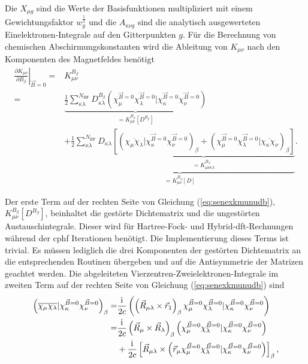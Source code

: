 Die $X_{\mu g}$ sind die Werte der Basisfunktionen multipliziert mit einem Gewichtungsfaktor $w_g^{\frac{1}{2}}$ und die $A_{\kappa\nu g}$ sind die analytisch ausgewerteten Einelektronen-Integrale auf den Gitterpunkten $g$. Für die Berechnung von chemischen Abschirmungskonstanten wird die Ableitung von $K_{\mu\nu}$ nach den Komponenten des Magnetfeldes benötigt
	\begin{equation}\label{eq:senexkmunudb}
	\begin{aligned}
	\left.\frac{\partial K_{\mu\nu}}{\partial B_\beta}\right\vert_{\vec{B}=0}=&K_{\mu\nu}^{B_\beta}\\
	=&\underbrace{\frac{1}{2}\sum_{\kappa\lambda}^{N_{\textrm{BF}}}D_{\kappa\lambda}^{B_\beta} \left(\chi_\mu^{\vec{B}=0}\chi_\lambda^{\vec{B}=0}\vert\chi_\kappa^{\vec{B}=0}\chi_\nu^{\vec{B}=0}\right)}_{=K_{\mu\nu}^{B_\beta}[D^{B_\beta}]}\\
	&\underbrace{+\frac{1}{2}\sum_{\kappa\lambda}^{N_{\textrm{BF}}}D_{\kappa\lambda} \underbrace{\left[\left(\overline{\chi_\mu\chi_\lambda}\vert\chi_\kappa^{\vec{B}=0}\chi_\nu^{\vec{B}=0}\right)_\beta+\left(\chi_\mu^{\vec{B}=0}\chi_\lambda^{\vec{B}=0}\vert\overline{\chi_\kappa\chi_\nu}\right)_\beta\right]}_{=K_{\mu\nu\kappa\lambda}^{B_\beta}}}_{=K_{\mu\nu}^{B_\beta}[D]}.
	\end{aligned}
	\end{equation}

Der erste Term auf der rechten Seite von Gleichung (\ref{eq:senexkmunudb}), $K_{\mu\nu}^{B_\beta}[D^{B_\beta}]$,  beinhaltet die gestörte Dichtematrix und die ungestörten Austauschintegrale. Dieser wird für Hartree-Fock- und Hybrid-\ac{dft}-Rechnungen während der \ac{cphf} Iterationen benötigt. Die Implementierung dieses Terms ist trivial. Es müssen lediglich die drei Komponenten der gestörten Dichtematrix an die entsprechenden Routinen übergeben und auf die Antisymmetrie der Matrizen geachtet werden. Die abgeleiteten Vierzentren-Zweielektronen-Integrale im zweiten Term auf der rechten Seite von Gleichung (\ref{eq:senexkmunudb}) sind
	\begin{equation}
	\begin{aligned}
	\left(\overline{\chi_\mu\chi_\lambda}\vert\chi_\kappa^{\vec{B}=0}\chi_\nu^{\vec{B}=0}\right)_\beta=&\frac{\mathrm{i}\mkern1mu}{2c} \left(\left(\vec{R}_{\mu\lambda}\times\vec{r}_1\right)_\beta\chi_\mu^{\vec{B}=0}\chi_\lambda^{\vec{B}=0}\vert\chi_\kappa^{\vec{B}=0}\chi_\nu^{\vec{B}=0}\right)\\
	=&\frac{\mathrm{i}\mkern1mu}{2c}\left(\vec{R}_\mu\times\vec{R}_\lambda\right)_\beta\left(\chi_\mu^{\vec{B}=0}\chi_\lambda^{\vec{B}=0}\vert\chi_\kappa^{\vec{B}=0}\chi_\nu^{\vec{B}=0}\right)\\
	&+\frac{\mathrm{i}\mkern1mu}{2c}\left[\vec{R}_{\mu\lambda}\times\left(\vec{r}_\mu\chi_\mu^{\vec{B}=0}\chi_\lambda^{\vec{B}=0}\vert\chi_\kappa^{\vec{B}=0}\chi_\nu^{\vec{B}=0}\right)\right]_\beta,
	\end{aligned}
	\end{equation}
	
